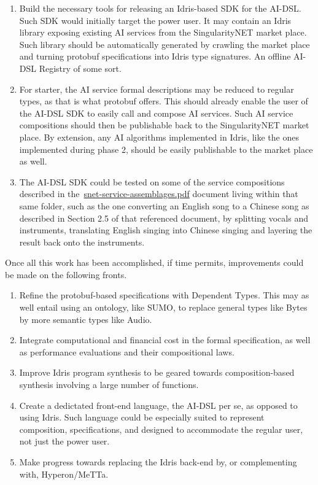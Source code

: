 \documentclass[]{report}
\begin{document}
\begin{enumerate}
\item Build the necessary tools for releasing an Idris-based SDK for
  the AI-DSL.  Such SDK would initially target the power user.  It may
  contain an Idris library exposing existing AI services from the
  SingularityNET market place.  Such library should be automatically
  generated by crawling the market place and turning protobuf
  specifications into Idris type signatures.  An offline AI-DSL
  Registry of some sort.
\item For starter, the AI service formal descriptions may be reduced
  to regular types, as that is what protobuf offers.  This should
  already enable the user of the AI-DSL SDK to easily call and compose
  AI services.  Such AI service compositions should then be
  publishable back to the SingularityNET market place.  By extension,
  any AI algorithms implemented in Idris, like the ones implemented
  during phase 2, should be easily publishable to the market place as
  well.
\item The AI-DSL SDK could be tested on some of the service
  compositions described in
  the~\href{https://github.com/singnet/ai-dsl/blob/master/doc/technical-reports/2022-Oct/snet-service-assemblages.pdf}{snet-service-assemblages.pdf}
  document living within that same folder, such as the one converting
  an English song to a Chinese song as described in Section 2.5 of
  that referenced document, by splitting vocals and instruments,
  translating English singing into Chinese singing and layering the
  result back onto the instruments.
\end{enumerate}
Once all this work has been accomplished, if time permits,
improvements could be made on the following fronts.
\begin{enumerate}
\item Refine the protobuf-based specifications with Dependent Types.
  This may as well entail using an ontology, like SUMO, to replace
  general types like Bytes by more semantic types like Audio.
\item Integrate computational and financial cost in the formal
  specification, as well as performance evaluations and their
  compositional laws.
\item Improve Idris program synthesis to be geared towards
  composition-based synthesis involving a large number of functions.
\item Create a dedictated front-end language, the AI-DSL per se, as
  opposed to using Idris.  Such language could be especially suited to
  represent composition, specifications, and designed to accommodate
  the regular user, not just the power user.
\item Make progress towards replacing the Idris back-end by, or
  complementing with, Hyperon/MeTTa.
\end{enumerate}
\end{document}
